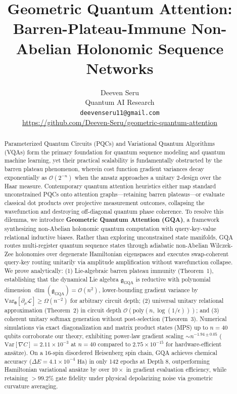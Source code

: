 \documentclass{article}
\title{Geometric Quantum Attention: Barren-Plateau-Immune Non-Abelian Holonomic Sequence Networks}
\author{Deeven Seru\\
Quantum AI Research\\
\texttt{deevenseru11@gmail.com}\\
\url{https://github.com/Deeven-Seru/geometric-quantum-attention}
}
\begin{document}
\maketitle

\begin{abstract}
Parameterized Quantum Circuits (PQCs) and Variational Quantum Algorithms (VQAs) form the primary foundation for quantum sequence modeling and quantum machine learning, yet their practical scalability is fundamentally obstructed by the barren plateau phenomenon, wherein cost function gradient variances decay exponentially as $\mathcal{O}(2^{-n})$ when the ansatz approaches a unitary $2$-design over the Haar measure. Contemporary quantum attention heuristics either map standard unconstrained PQCs onto attention graphs—retaining barren plateaus—or evaluate classical dot products over projective measurement outcomes, collapsing the wavefunction and destroying off-diagonal quantum phase coherence. To resolve this dilemma, we introduce \textbf{Geometric Quantum Attention (GQA)}, a framework synthesizing non-Abelian holonomic quantum computation with query-key-value relational inductive biases. Rather than exploring unconstrained state manifolds, GQA routes multi-register quantum sequence states through adiabatic non-Abelian Wilczek-Zee holonomies over degenerate Hamiltonian eigenspaces and executes swap-coherent query-key routing unitarily via amplitude amplification without wavefunction collapse. We prove analytically: (1) Lie-algebraic barren plateau immunity (Theorem~1), establishing that the dynamical Lie algebra $\mathfrak{g}_{\mathrm{GQA}}$ is reductive with polynomial dimension $\dim(\mathfrak{g}_{\mathrm{GQA}}) = \mathcal{O}(n^2)$, lower-bounding gradient variance by $\mathrm{Var}_{\boldsymbol{\theta}}[\partial_\mu \mathcal{L}] \ge \Omega(n^{-2})$ for arbitrary circuit depth; (2) universal unitary relational approximation (Theorem~2) in circuit depth $\mathcal{O}(\mathrm{poly}(n, \log(1/\epsilon)))$; and (3) coherent unitary softmax generation without post-selection (Theorem~3). Numerical simulations via exact diagonalization and matrix product states (MPS) up to $n=40$ qubits corroborate our theory, exhibiting power-law gradient scaling $\sim n^{-1.94 \pm 0.05}$ ($\mathrm{Var}[\nabla C] = 2.11 \times 10^{-3}$ at $n=40$ compared to $2.75 \times 10^{-15}$ for hardware-efficient ans\"atze). On a 16-spin disordered Heisenberg spin chain, GQA achieves chemical accuracy ($\Delta E = 4.1 \times 10^{-4}\text{ Ha}$) in only 142 epochs at Depth 8, outperforming Hamiltonian variational ans\"atze by over $10\times$ in gradient evaluation efficiency, while retaining $>99.2\%$ gate fidelity under physical depolarizing noise via geometric curvature averaging.
\end{abstract}
\end{document}

